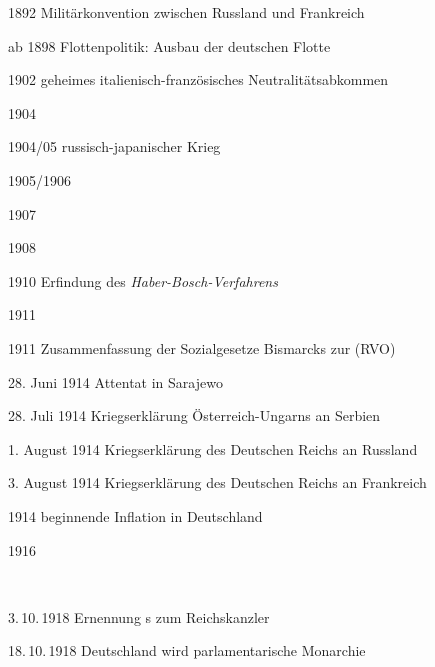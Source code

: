 \begin{chronik}
\item[1892] Militärkonvention zwischen Russland und Frankreich

\item[ab 1898] Flottenpolitik: Ausbau der deutschen Flotte

\item[1902] geheimes italienisch-französisches Neutralitätsabkommen

\item[1904] 

\item[1904/05] russisch-japanischer Krieg

\item[1905/1906] 

\item[1907] 

\item[1908] 

\item[1910]
Erfindung des \emph{Haber-Bosch-Verfahrens}

\item[1911] 

\item[1911]
Zusammenfassung der Sozialgesetze Bismarcks zur
 (RVO)

\item[28. Juni 1914] Attentat in Sarajewo

\item[28. Juli 1914] Kriegserklärung Österreich-Ungarns an Serbien

\item[1. August 1914] Kriegserklärung des Deutschen Reichs an Russland

\item[3. August 1914] Kriegserklärung des Deutschen Reichs an Frankreich

\item[1914]
beginnende Inflation in Deutschland

\item[1916]

\ \\

\item[3.\,10.\,1918]
Ernennung s zum Reichskanzler

\item[18.\,10.\,1918]
Deutschland wird parlamentarische Monarchie


\end{chronik}
